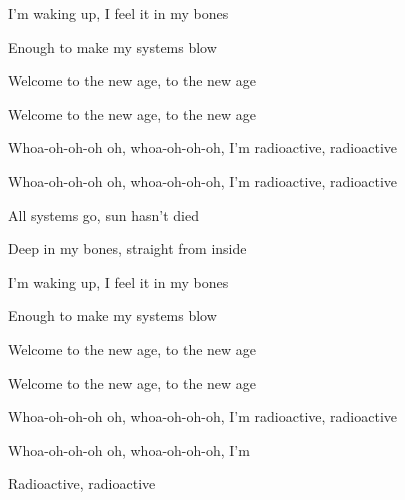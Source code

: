 \begin{song}
\bigskip

I'm waking up, I feel it in my bones \par
Enough to make my systems blow \par
{}Welcome to the new age,  to the new age \par
{}Welcome to the new age,  to the new age \par
{} Whoa-oh-oh-oh oh,  whoa-oh-oh-oh, I'm  radioactive,  radioactive \par
{} Whoa-oh-oh-oh oh,  whoa-oh-oh-oh, I'm  radioactive,  radioactive \par

\bigskip

 \par
{}All systems go, sun hasn't died \par
{}Deep in my bones, straight from inside \par

\bigskip

I'm waking up, I feel it in my bones \par
Enough to make my systems blow \par
{}Welcome to the new age,  to the new age \par
{}Welcome to the new age,  to the new age \par
{} Whoa-oh-oh-oh oh,  whoa-oh-oh-oh, I'm  radioactive,  radioactive \par
{} Whoa-oh-oh-oh oh,  whoa-oh-oh-oh, I'm \par
{} Radioactive,  radioactive \par

\end{song}

